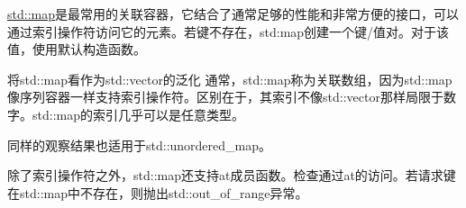 \href{http://en.cppreference.com/w/cpp/container/map}{std::map}是最常用的关联容器，它结合了通常足够的性能和非常方便的接口，可以通过索引操作符访问它的元素。若键不存在，std:map创建一个键/值对。对于该值，使用默认构造函数。

\begin{myTip}{将std::map看作为std::vector的泛化}
通常，std::map称为关联数组，因为std::map像序列容器一样支持索引操作符。区别在于，其索引不像std::vector那样局限于数字。std::map的索引几乎可以是任意类型。

同样的观察结果也适用于std::unordered\_map。
\end{myTip}

除了索引操作符之外，std::map还支持at成员函数。检查通过at的访问。若请求键在std::map中不存在，则抛出std::out\_of\_range异常。

















































